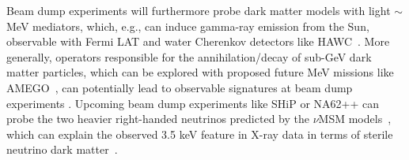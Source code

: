\documentclass[../report.tex]{subfiles}
\begin{document}
Beam dump experiments will furthermore probe dark matter models with light $\sim$MeV mediators, which, e.g., can induce gamma-ray emission from the Sun, observable with Fermi LAT and water Cherenkov detectors like HAWC~\cite{Arina2018-gl}.  More generally, operators responsible for the annihilation/decay of sub-GeV dark matter particles, which can be explored with proposed future MeV missions like AMEGO~\cite{Moiseev2018-kg}, can potentially lead to observable signatures at beam dump experiments \cite{Kumar2018-be}.  Upcoming beam dump experiments like SHiP or NA62++ can probe the two heavier right-handed neutrinos predicted by the $\nu$MSM models~\cite{Beacham2019-os}, which can explain the observed 3.5 keV feature in X-ray data in terms of sterile neutrino dark matter~\cite{Bulbul2014-on, Boyarsky2014-gy}.
\end{document}
